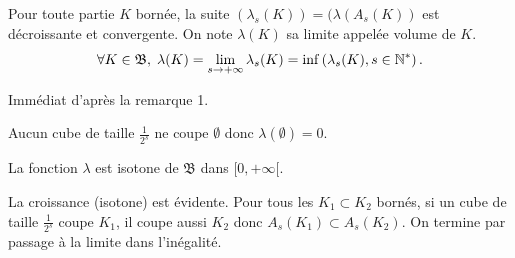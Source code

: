 \begin{defi}
Pour toute partie $K$ bornée, la suite $(\lambda_s(K)) = (\lambda(A_s(K))$ est décroissante et convergente. On note $\lambda(K)$ sa limite appelée volume de $K$.
\begin{displaymath}
  \forall K \in \mathfrak{B}, \; \lambda(K) = \lim_{s\rightarrow +\infty} \lambda_s(K) = \inf\left( \lambda_s(K), s \in \mathbb{N}^*\right).
\end{displaymath}
\end{defi}
\begin{demo}
 Immédiat d'après la remarque 1.
\end{demo}
\begin{rem}
  Aucun cube de taille $\frac{1}{2^s}$ ne coupe $\emptyset$ donc  $\lambda(\emptyset)=0$.
\end{rem}

\begin{propn}
  La fonction $\lambda$ est isotone de $\mathfrak{B}$ dans $[0, + \infty[$.
\end{propn}
\begin{demo}
 La croissance (isotone) est évidente. Pour tous les $K_1 \subset K_2$ bornés, si un cube de taille $\frac{1}{2^s}$ coupe $K_1$, il coupe aussi $K_2$ donc $A_s(K_1) \subset A_s(K_2)$. On termine par passage à la limite dans l'inégalité.
\end{demo}

